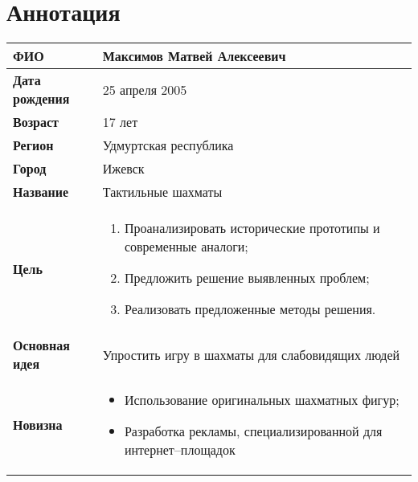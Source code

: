 \section*{Аннотация}
\begin{table}[H]
    \centering
    \begin{tabular}{l p{25em}}
        \toprule
        \textbf{ФИО} & Максимов Матвей Алексеевич \\
        \midrule
        \textbf{Дата рождения} & 25 апреля 2005 \\
        \midrule
        \textbf{Возраст} & 17 лет \\
        \midrule
        \textbf{Регион} & Удмуртская республика \\
        \midrule
        \textbf{Город} & Ижевск \\
        \midrule
        \textbf{Название} & Тактильные шахматы \\
        \midrule
        \textbf{Цель} & 
            \begin{enumerate}
                \item Проанализировать исторические прототипы и современные аналоги;
                \item Предложить решение выявленных проблем;
                \item Реализовать предложенные методы решения.
            \end{enumerate} \\
        \midrule
        \textbf{Основная идея} & Упростить игру в шахматы для слабовидящих людей \\
        \midrule
        \textbf{Новизна} & 
            \begin{itemize}
                \item Использование оригинальных шахматных фигур;
                \item Разработка рекламы, специализированной для интернет--площадок
            \end{itemize} \\
        \bottomrule
    \end{tabular}
\end{table}
